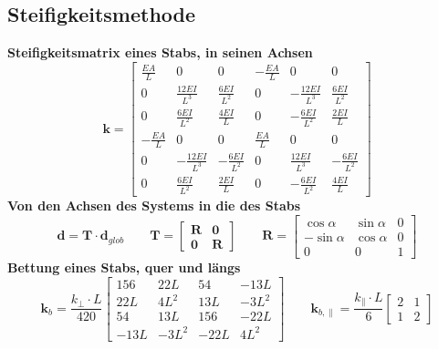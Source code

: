 \documentclass[11pt,a4paper]{article}
\begin{document}
\subsection{Steifigkeitsmethode}
\noindent\textbf{Steifigkeitsmatrix eines Stabs, in seinen Achsen}
\begin{equation*}
\mathbf{k} = \begin{bmatrix} \frac{EA}{L} & 0 & 0 & -\frac{EA}{L} & 0 & 0 \\ 0 & \frac{12EI}{L^3} & \frac{6EI}{L^2} & 0 & -\frac{12EI}{L^3} & \frac{6EI}{L^2} \\ 0 & \frac{6EI}{L^2} & \frac{4EI}{L} & 0 & -\frac{6EI}{L^2} & \frac{2EI}{L} \\ -\frac{EA}{L} & 0 & 0 & \frac{EA}{L} & 0 & 0 \\ 0 & -\frac{12EI}{L^3} & -\frac{6EI}{L^2} & 0 & \frac{12EI}{L^3} & -\frac{6EI}{L^2} \\ 0 & \frac{6EI}{L^2} & \frac{2EI}{L} & 0 & -\frac{6EI}{L^2} & \frac{4EI}{L} \end{bmatrix}
\end{equation*}
\noindent\textbf{Von den Achsen des Systems in die des Stabs}
\begin{equation*}
\mathbf{d} = \mathbf{T} \cdot \mathbf{d}_{glob} \qquad \mathbf{T} = \begin{bmatrix} \mathbf{R} & \mathbf{0} \\ \mathbf{0} & \mathbf{R} \end{bmatrix} \qquad \mathbf{R} = \begin{bmatrix} \cos\alpha & \sin\alpha & 0 \\ -\sin\alpha & \cos\alpha & 0 \\ 0 & 0 & 1 \end{bmatrix}
\end{equation*}
\noindent\textbf{Bettung eines Stabs, quer und längs}
\begin{equation*}
\mathbf{k}_{b} = \frac{k_{\perp} \cdot L}{420} \begin{bmatrix} 156 & 22L & 54 & -13L \\ 22L & 4L^2 & 13L & -3L^2 \\ 54 & 13L & 156 & -22L \\ -13L & -3L^2 & -22L & 4L^2 \end{bmatrix} \qquad \mathbf{k}_{b,\parallel} = \frac{k_{\parallel} \cdot L}{6} \begin{bmatrix} 2 & 1 \\ 1 & 2 \end{bmatrix}
\end{equation*}
\end{document}
